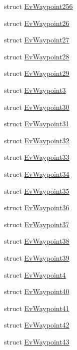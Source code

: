 \begin{DoxyCompactItemize}
struct \hyperlink{structmove__base__z__client_1_1EvWaypoint256}{Ev\+Waypoint256}
\item 
struct \hyperlink{structmove__base__z__client_1_1EvWaypoint26}{Ev\+Waypoint26}
\item 
struct \hyperlink{structmove__base__z__client_1_1EvWaypoint27}{Ev\+Waypoint27}
\item 
struct \hyperlink{structmove__base__z__client_1_1EvWaypoint28}{Ev\+Waypoint28}
\item 
struct \hyperlink{structmove__base__z__client_1_1EvWaypoint29}{Ev\+Waypoint29}
\item 
struct \hyperlink{structmove__base__z__client_1_1EvWaypoint3}{Ev\+Waypoint3}
\item 
struct \hyperlink{structmove__base__z__client_1_1EvWaypoint30}{Ev\+Waypoint30}
\item 
struct \hyperlink{structmove__base__z__client_1_1EvWaypoint31}{Ev\+Waypoint31}
\item 
struct \hyperlink{structmove__base__z__client_1_1EvWaypoint32}{Ev\+Waypoint32}
\item 
struct \hyperlink{structmove__base__z__client_1_1EvWaypoint33}{Ev\+Waypoint33}
\item 
struct \hyperlink{structmove__base__z__client_1_1EvWaypoint34}{Ev\+Waypoint34}
\item 
struct \hyperlink{structmove__base__z__client_1_1EvWaypoint35}{Ev\+Waypoint35}
\item 
struct \hyperlink{structmove__base__z__client_1_1EvWaypoint36}{Ev\+Waypoint36}
\item 
struct \hyperlink{structmove__base__z__client_1_1EvWaypoint37}{Ev\+Waypoint37}
\item 
struct \hyperlink{structmove__base__z__client_1_1EvWaypoint38}{Ev\+Waypoint38}
\item 
struct \hyperlink{structmove__base__z__client_1_1EvWaypoint39}{Ev\+Waypoint39}
\item 
struct \hyperlink{structmove__base__z__client_1_1EvWaypoint4}{Ev\+Waypoint4}
\item 
struct \hyperlink{structmove__base__z__client_1_1EvWaypoint40}{Ev\+Waypoint40}
\item 
struct \hyperlink{structmove__base__z__client_1_1EvWaypoint41}{Ev\+Waypoint41}
\item 
struct \hyperlink{structmove__base__z__client_1_1EvWaypoint42}{Ev\+Waypoint42}
\item 
struct \hyperlink{structmove__base__z__client_1_1EvWaypoint43}{Ev\+Waypoint43}
\item 

\end{DoxyCompactItemize}
